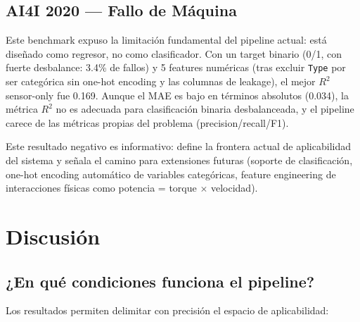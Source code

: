 \documentclass[10pt]{article}
\begin{document}
\subsection{AI4I 2020 --- Fallo de Máquina}

Este benchmark expuso la limitación fundamental del pipeline actual: está diseñado como regresor, no como clasificador. Con un target binario (0/1, con fuerte desbalance: 3.4\% de fallos) y 5 features numéricas (tras excluir \texttt{Type} por ser categórica sin one-hot encoding y las columnas de leakage), el mejor $R^2$ sensor-only fue 0.169. Aunque el MAE es bajo en términos absolutos (0.034), la métrica $R^2$ no es adecuada para clasificación binaria desbalanceada, y el pipeline carece de las métricas propias del problema (precision/recall/F1).

Este resultado negativo es informativo: define la frontera actual de aplicabilidad del sistema y señala el camino para extensiones futuras (soporte de clasificación, one-hot encoding automático de variables categóricas, feature engineering de interacciones físicas como potencia = torque $\times$ velocidad).

\section{Discusión}

\subsection{¿En qué condiciones funciona el pipeline?}

Los resultados permiten delimitar con precisión el espacio de aplicabilidad:
\end{document}
